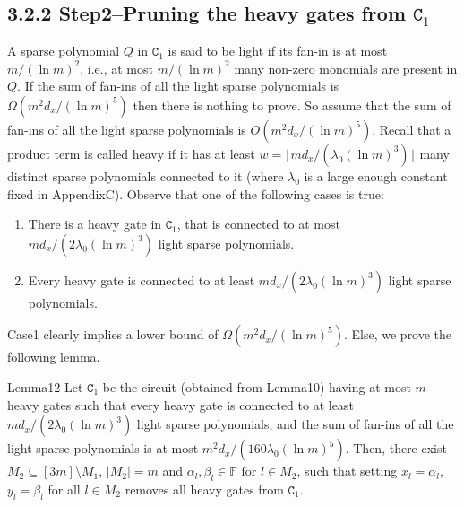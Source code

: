 \subsection*{3.2.2 Step2--Pruning the heavy gates from $\mathtt C_1$}
A sparse polynomial $Q$ in $\mathtt C_1$ is said to be light if its fan-in is at most $m/(\ln m)^2$, i.e., at most $m/(\ln m)^2$ many non-zero monomials are present in $Q$. If the sum of fan-ins of all the light sparse polynomials is $\Omega(m^2d_x/(\ln m)^5)$ then there is nothing to prove. So assume that the sum of fan-ins of all the light sparse polynomials is $O(m^2d_x/(\ln m)^5)$. Recall that a product term is called heavy if it has at least $w=\lfloor md_x/(\lambda_0(\ln m)^3)\rfloor$ many distinct sparse polynomials connected to it (where $\lambda_0$ is a large enough constant fixed in AppendixC). Observe that one of the following cases is true:
\begin{enumerate}
\item There is a heavy gate in $\mathtt C_1$, that is connected to at most $md_x/(2\lambda_0(\ln m)^3)$ light sparse polynomials.
\item Every heavy gate is connected to at least $md_x/(2\lambda_0(\ln m)^3)$ light sparse polynomials.
\end{enumerate}
Case1 clearly implies a lower bound of $\Omega(m^2d_x/(\ln m)^5)$. Else, we prove the following lemma.
\begin{authorclaim}{Lemma12}
Let $\mathtt C_1$ be the circuit (obtained from Lemma10) having at most $m$ heavy gates such that every heavy gate is connected to at least $md_x/(2\lambda_0(\ln m)^3)$ light sparse polynomials, and the sum of fan-ins of all the light sparse polynomials is at most $m^2d_x/(160\lambda_0(\ln m)^5)$. Then, there exist $M_2\subseteq[3m]\setminus M_1$, $|M_2|=m$ and $\alpha_l,\beta_l\in\mathbb F$ for $l\in M_2$, such that setting $x_l=\alpha_l$, $y_l=\beta_l$ for all $l\in M_2$ removes all heavy gates from $\mathtt C_1$.
\end{authorclaim}
